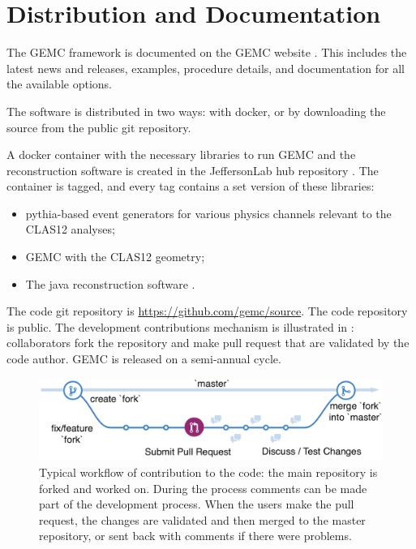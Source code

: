 \section{Distribution and Documentation}

The GEMC framework is documented on the GEMC website \cite{GEMC}. This includes the latest news and releases,
examples, procedure details, and documentation for all the available options.

The software is distributed in two ways: with docker, or by downloading the source from the public git repository.


A docker container with the necessary libraries to run GEMC and the reconstruction software
is created in the JeffersonLab hub repository \cite{jlabDocker}.
The container is tagged, and every tag contains a set version of these libraries:

\begin{itemize}
	\item pythia-based event generators for various physics channels relevant to the CLAS12 analyses;
	\item GEMC with the CLAS12 geometry;
	\item The java reconstruction software \cite{recon-nim}.
\end{itemize}


The code git repository is \url{https://github.com/gemc/source}.
The code repository is public. The development contributions mechanism is illustrated in : collaborators fork the repository
and make pull request that are validated by the code author.
GEMC is released on a semi-annual cycle.

\begin{figure}
	\centering
	\includegraphics[width=0.99\columnwidth,keepaspectratio]{img/github.png}
	\caption{Typical workflow of contribution to the code: the main repository is forked and worked on. During the process comments
             can be made part of the development process. When the users make the pull request, the changes are validated and then merged
             to the master repository, or sent back with comments if there were problems.}
	\label{fig:github}
\end{figure}


